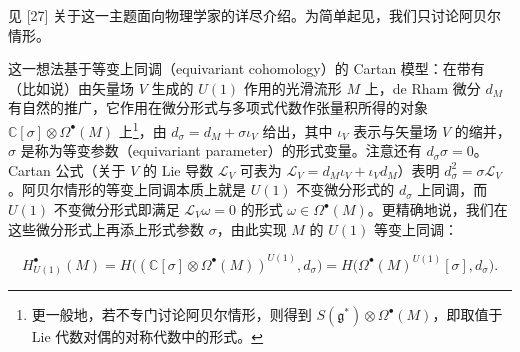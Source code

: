 


见 [27] 关于这一主题面向物理学家的详尽介绍。为简单起见，我们只讨论阿贝尔情形。

这一想法基于等变上同调（equivariant cohomology）的 Cartan 模型：在带有（比如说）由矢量场 $V$ 生成的 $U(1)$ 作用的光滑流形 $M$ 上，de Rham 微分 $d_M$ 有自然的推广，它作用在微分形式与多项式代数作张量积所得的对象 $\mathbb{C}[\sigma]\otimes\Omega^\bullet(M)$ 上\footnote{更一般地，若不专门讨论阿贝尔情形，则得到 $S(\mathfrak{g}^*)\otimes\Omega^\bullet(M)$，即取值于 Lie 代数对偶的对称代数中的形式。}，由 $d_\sigma=d_M+\sigma\iota_V$ 给出，其中 $\iota_V$ 表示与矢量场 $V$ 的缩并，$\sigma$ 是称为等变参数（equivariant parameter）的形式变量。注意还有 $d_\sigma\sigma=0$。Cartan 公式（关于 $V$ 的 Lie 导数 $\mathcal{L}_V$ 可表为 $\mathcal{L}_V=d_M\iota_V+\iota_V d_M$）表明 $d_\sigma^2=\sigma\mathcal{L}_V$。阿贝尔情形的等变上同调本质上就是 $U(1)$ 不变微分形式的 $d_\sigma$ 上同调，而 $U(1)$ 不变微分形式即满足 $\mathcal{L}_V\omega=0$ 的形式 $\omega\in\Omega^\bullet(M)$。更精确地说，我们在这些微分形式上再添上形式参数 $\sigma$，由此实现 $M$ 的 $U(1)$ 等变上同调：

\begin{equation}
H^\bullet_{U(1)}(M) = H\big((\mathbb{C}[\sigma]\otimes\Omega^\bullet(M))^{U(1)}, d_\sigma\big) = H\big(\Omega^\bullet(M)^{U(1)}[\sigma], d_\sigma\big).
\tag{2.8}
\end{equation}

